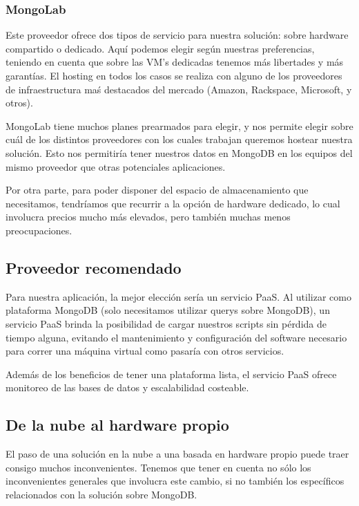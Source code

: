 \documentclass[a4paper,10pt,twoside]{article}
\begin{document}
\subsubsection{MongoLab}

Este proveedor ofrece dos tipos de servicio para nuestra solución: sobre hardware compartido o dedicado. Aquí podemos elegir según nuestras preferencias, teniendo en cuenta que sobre las VM's dedicadas tenemos más libertades y más garantías. El hosting en todos los casos se realiza con alguno de los proveedores de infraestructura maś destacados del mercado (Amazon, Rackspace, Microsoft, y otros).

MongoLab tiene muchos planes prearmados para elegir, y nos permite elegir sobre cuál de los distintos proveedores con los cuales trabajan queremos hostear nuestra solución. Esto nos permitiría tener nuestros datos en MongoDB en los equipos del mismo proveedor que otras potenciales aplicaciones.

Por otra parte, para poder disponer del espacio de almacenamiento que necesitamos, tendríamos que recurrir a la opción de hardware dedicado, lo cual involucra precios mucho más elevados, pero también muchas menos preocupaciones.


\subsection{Proveedor recomendado}

Para nuestra aplicación, la mejor elección sería un servicio PaaS. Al utilizar como plataforma MongoDB (solo necesitamos utilizar querys sobre MongoDB), un servicio PaaS brinda la posibilidad de cargar nuestros scripts sin pérdida de tiempo alguna, evitando el mantenimiento y configuración del software necesario para correr una máquina virtual como pasaría con otros servicios.

Además de los beneficios de tener una plataforma lista, el servicio PaaS ofrece monitoreo de las bases de datos y escalabilidad costeable.


\subsection{De la nube al hardware propio}

El paso de una solución en la nube a una basada en hardware propio puede traer consigo muchos inconvenientes. Tenemos que tener en cuenta no sólo los inconvenientes generales que involucra este cambio, si no también los específicos relacionados con la solución sobre MongoDB.
\end{document}
